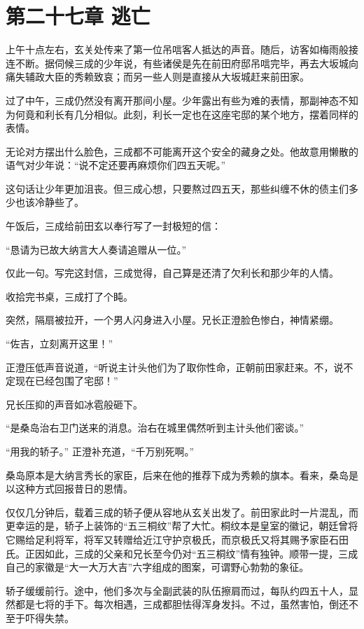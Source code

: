 \documentclass[
]{book}
\begin{document}
\chapter*{第二十七章 逃亡}\label{ux7b2cux4e8cux5341ux4e03ux7ae0-ux9003ux4ea1}

上午十点左右，玄关处传来了第一位吊唁客人抵达的声音。随后，访客如梅雨般接连不断。据伺候三成的少年说，有些诸侯是先在前田府邸吊唁完毕，再去大坂城向痛失辅政大臣的秀赖致哀；而另一些人则是直接从大坂城赶来前田家。

过了中午，三成仍然没有离开那间小屋。少年露出有些为难的表情，那副神态不知为何竟和利长有几分相似。此刻，利长一定也在这座宅邸的某个地方，摆着同样的表情。

无论对方摆出什么脸色，三成都不可能离开这个安全的藏身之处。他故意用懒散的语气对少年说：``说不定还要再麻烦你们四五天呢。''

这句话让少年更加沮丧。但三成心想，只要熬过四五天，那些纠缠不休的债主们多少也该冷静些了。

午饭后，三成给前田玄以奉行写了一封极短的信：

``恳请为已故大纳言大人奏请追赠从一位。''

仅此一句。写完这封信，三成觉得，自己算是还清了欠利长和那少年的人情。

收拾完书桌，三成打了个盹。

突然，隔扇被拉开，一个男人闪身进入小屋。兄长正澄脸色惨白，神情紧绷。

``佐吉，立刻离开这里！''

正澄压低声音说道，``听说主计头他们为了取你性命，正朝前田家赶来。不，说不定现在已经包围了宅邸！''

兄长压抑的声音如冰雹般砸下。

``是桑岛治右卫门送来的消息。治右在城里偶然听到主计头他们密谈。''

``用我的轿子。'' 正澄补充道，``千万别死啊。''

桑岛原本是大纳言秀长的家臣，后来在他的推荐下成为秀赖的旗本。看来，桑岛是以这种方式回报昔日的恩情。

仅仅几分钟后，载着三成的轿子便从容地从玄关出发了。前田家此时一片混乱，而更幸运的是，轿子上装饰的``五三桐纹''帮了大忙。桐纹本是皇室的徽记，朝廷曾将它赐给足利将军，将军又转赠给近江守护京极氏，而京极氏又将其赐予家臣石田氏。正因如此，三成的父亲和兄长至今仍对``五三桐纹''情有独钟。顺带一提，三成自己的家徽是``大一大万大吉''六字组成的图案，可谓野心勃勃的象征。

轿子缓缓前行。途中，他们多次与全副武装的队伍擦肩而过，每队约四五十人，显然都是七将的手下。每次相遇，三成都胆怯得浑身发抖。不过，虽然害怕，倒还不至于吓得失禁。
\end{document}
